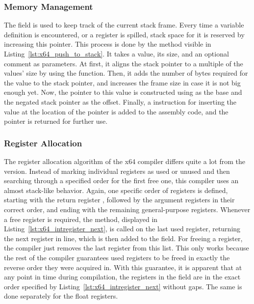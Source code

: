 \subsubsection{Memory Management}

The  field is used to keep track of the current stack frame.
Every time a variable definition is encountered, or a register is spilled, stack space for it is reserved by increasing this pointer.
This process is done by the  method visible in Listing~\ref{lst:x64_push_to_stack}.
It takes a value, its size, and an optional comment as parameters.
At first, it aligns the stack pointer to a multiple of the values' size by using the  function.
Then, it adds the number of bytes required for the value to the stack pointer, and increases the frame size in case it is not big enough yet.
Now, the pointer to this value is constructed using  as the base and the negated stack pointer as the offset.
Finally, a  instruction for inserting the value at the location of the pointer is added to the assembly code, and the pointer is returned for further use.


\subsubsection{Register Allocation}


The register allocation algorithm of the x64 compiler differs quite a lot from the \riscv{} version.
Instead of marking individual registers as used or unused and then searching through a specified order for the first free one, this compiler uses an almost stack-like behavior.
Again, one specific order of registers is defined, starting with the return register , followed by the argument registers in their correct order, and ending with the remaining general-purpose registers.
Whenever a free register is required, the  method, displayed in Listing~\ref{lst:x64_intregister_next}, is called on the last used register, returning the next register in line, which is then added to the  field.
For freeing a register, the compiler just removes the last register from this list.
This only works because the rest of the compiler guarantees used registers to be freed in exactly the reverse order they were acquired in.
With this guarantee, it is apparent that at any point in time during compilation, the registers in the  field are in the exact order specified by Listing~\ref{lst:x64_intregister_next} without gaps.
The same is done separately for the float registers.

